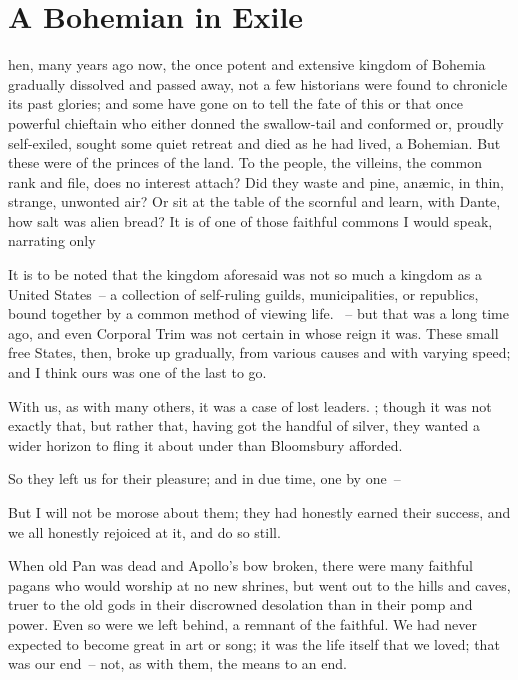 \chapter{A Bohemian in Exile}

\blank


\strut {\sc hen,} many years ago now, the once potent and extensive kingdom of
Bohemia gradually dissolved and passed away, not a few historians were
found to chronicle its past glories; and some have gone on to tell the
fate of this or that once powerful chieftain who either donned the
swallow-tail and conformed or, proudly self-exiled, sought some quiet
retreat and died as he had lived, a Bohemian. But these were of the
princes of the land. To the people, the villeins, the common rank and
file, does no interest attach? Did they waste and pine, an{\ae}mic, in
thin, strange, unwonted air? Or sit at the table of the scornful and
learn, with Dante, how salt was alien bread? It is of one of those
faithful commons I would speak, narrating only 

It is to be noted that the kingdom aforesaid was not so much a kingdom
as a United States~-- a collection of self-ruling guilds,
municipalities, or republics, bound together by a common method of
viewing life. ~-- but
that was a long time ago, and even Corporal Trim was not certain in
whose reign it was. These small free States, then, broke up gradually,
from various causes and with varying speed; and I think ours was one
of the last to go.

With us, as with many others, it was a case of lost
leaders. ; though it
was not exactly that, but rather that, having got the handful of
silver, they wanted a wider horizon to fling it about under than
Bloomsbury afforded.

\blank
\startnarrower
So they left us for their pleasure; and in due time,
one by one~-- 
\stopnarrower
\blank

But I will not be morose about them; they had honestly earned their
success, and we all honestly rejoiced at it, and do so still.

When old Pan was dead and Apollo's bow broken, there were many
faithful pagans who would worship at no new shrines, but went out to
the hills and caves, truer to the old gods in their discrowned
desolation than in their pomp and power. Even so were we left behind,
a remnant of the faithful. We had never expected to become great in art
or song; it was the life itself that we loved; that was our end~-- not,
as with them, the means to an end.

